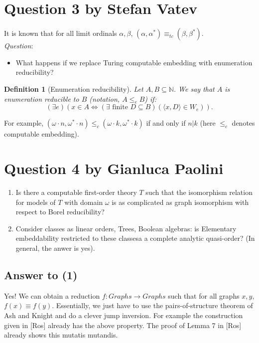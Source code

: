 \documentclass{article}
\newtheorem{definition}{Definition}
\begin{document}
\section*{Question 3 {\small{by Stefan Vatev}}}
It is known that for all limit ordinals $\alpha,\beta$, $(\alpha,\alpha^*)\equiv_{tc} (\beta,\beta^*)$.\\
\textit{Question}:
\begin{itemize}
    \item What happens if we replace Turing computable embedding with enumeration reducibility?
\end{itemize}

\begin{definition}[Enumeration reducibility]
    Let $A,B \subseteq \mathbb{N}$. We say that $A$ is enumeration reducible to $B$ (notation, $A \leq_e B$) if:
    \[(\exists e)(x \in A \iff (\exists \text{ finite } D\subseteq B)(\langle x,D\rangle \in W_e)).\]
\end{definition}
For example, $(\omega\cdot n, \omega^* \cdot n) \leq_c (\omega \cdot k, \omega^* \cdot k) $ if and only if $n | k$ (here $\leq_c$ denotes computable embedding).\\


\section*{Question 4 {\small{by Gianluca Paolini}}}

\begin{enumerate}
    \item Is there a computable first-order theory $T$ such that the isomorphism relation for models of $T$ with domain $\omega$ is as complicated as graph isomorphism with respect to Borel reducibility?
    \item Consider classes as linear orders, Trees, Boolean algebras: is Elementary embeddability restricted to these classesa a complete analytic quasi-order? (In general, the anwer is yes).
\end{enumerate}

\subsection*{Answer to (1)}
Yes! We can obtain a reduction $f:Graphs \to Graphs$ such that for all graphs
$x,y$, $f(x)\equiv f(y)$. Essentially, we just have to use the
pairs-of-structure theorem of Ash and Knight and do a clever jump inversion. For
example the construction given in [Ros] already has the above property. The
 proof of Lemma 7 in [Ros] already shows this mutatis mutandis.
\end{document}
